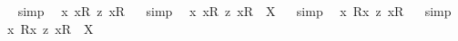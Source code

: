 \begin{isabellebody}
\isadelimproof
\ %
\endisadelimproof
%
\isatagproof
{}\isamarkupfalse%
\ {\isacharparenleft}simp{\isacharparenright}\ \isamarkupfalse%
%
\endisatagproof
{\isafoldproof}%
%
\isadelimproof
%
\endisadelimproof
\isanewline
\isanewline
{}\isamarkupfalse%
\ {\isachardoublequoteopen}{\isacharbrackleft}{\isasymforall}{\isacharparenleft}{\isasymlambda}x{\isachardot}\ {\isacharless}{\isachardot}x{\isachardot}{\isasymcirc}R{}{\isachargreater}\ {\isasymrightarrow}\isactrlsup z\ {\isacharless}{\isachardot}x{\isachardot}{\isasymcirc}R{}{\isachargreater}{\isacharparenright}{\isacharbrackright}{\isachardoublequoteclose}%
\isadelimproof
\ %
\endisadelimproof
%
\isatagproof
{}\isamarkupfalse%
\ {\isacharparenleft}simp{\isacharparenright}\ \isamarkupfalse%
%
\endisatagproof
{\isafoldproof}%
%
\isadelimproof
%
\endisadelimproof
\isanewline
{}\isamarkupfalse%
\ {\isachardoublequoteopen}{\isasymforall}{\isacharparenleft}{\isasymlambda}x{\isachardot}\ {\isacharless}{\isachardot}x{\isachardot}{\isasymcirc}R{}{\isachargreater}\ {\isasymrightarrow}\isactrlsup z\ {\isacharless}{\isachardot}x{\isachardot}{\isasymcirc}R{}{\isachargreater}{\isacharparenright}\ {\isacharequal}\ X{\isachardoublequoteclose}%
\isadelimproof
\ %
\endisadelimproof
%
\isatagproof
{}\isamarkupfalse%
\ {\isacharparenleft}simp{\isacharparenright}\ \isamarkupfalse%
%
\endisatagproof
{\isafoldproof}%
%
\isadelimproof
%
\endisadelimproof
\isanewline
\isanewline
{}\isamarkupfalse%
\ {\isachardoublequoteopen}{\isacharbrackleft}{\isasymforall}{\isacharparenleft}{\isasymlambda}x{\isachardot}\ {\isacharless}R{}{\isasymbullet}{\isachardot}x{\isachardot}{\isachargreater}\ {\isasymrightarrow}\isactrlsup z\ {\isacharless}{\isachardot}x{\isachardot}{\isasymcirc}R{}{\isachargreater}{\isacharparenright}{\isacharbrackright}{\isachardoublequoteclose}%
\isadelimproof
\ %
\endisadelimproof
%
\isatagproof
{}\isamarkupfalse%
\ {\isacharparenleft}simp{\isacharparenright}\ \isamarkupfalse%
%
\endisatagproof
{\isafoldproof}%
%
\isadelimproof
%
\endisadelimproof
\isanewline
{}\isamarkupfalse%
\ {\isachardoublequoteopen}{\isasymforall}{\isacharparenleft}{\isasymlambda}x{\isachardot}\ {\isacharless}R{}{\isasymbullet}{\isachardot}x{\isachardot}{\isachargreater}\ {\isasymrightarrow}\isactrlsup z\ {\isacharless}{\isachardot}x{\isachardot}{\isasymcirc}R{}{\isachargreater}{\isacharparenright}\ {\isacharequal}\ X{\isachardoublequoteclose}%

\end{isabellebody}
